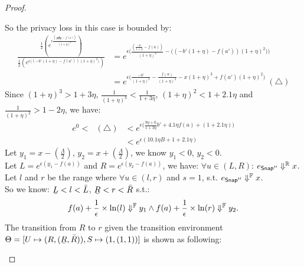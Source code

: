 \documentclass[a4paper,11pt]{article}
\begin{document}
\begin{proof}
\begin{itemize}
		So the privacy loss in this case is bounded by:
		\[
		\begin{array}{ll}
		\frac
		{\frac{1}{2}(e^{\epsilon 
		\frac{(\frac{-b'}{1 + \eta} - f(a))}{(1 + \eta)^2}})}
		{\frac{1}{2}(e^{\epsilon 
		\big((-b'(1 + \eta) - f(a'))(1 + \eta)^2 \big)})}
		& = e^{\epsilon
		\bigg(
		\frac{(\frac{-b'}{1 + \eta} - f(a))}{(1 + \eta)^2}
		-
		\big((-b'(1 + \eta) - f(a'))(1 + \eta)^2 \big)
		\bigg)}\\
		& = e^{\epsilon
		\bigg(
		\frac{-b'}{(1 + \eta)^3} - \frac{f(a)}{(1 + \eta)^2}
		-
		x(1 + \eta)^3 + f(a')(1 + \eta)^2 
		\bigg)} ~ (\triangle)
		\end{array}
		\]
		Since $ (1 + \eta)^3 > 1 + 3\eta$,  $\frac{1}{(1 + \eta)^3} < \frac{1}{1 + 3\eta} $, $(1 + \eta)^2 < 1 + 2.1\eta$ and $\frac{1}{(1 + \eta)^2} > 1 - 2 \eta$, we have:
		\[
		\begin{array}{ll}
		e^0
		<
		~~~ (\triangle) & < e^{\epsilon \big( 
		\frac{9\eta + 6}{1 + 3\eta} b'
		+ 4.1 \eta f(a)
		+ (1 + 2.1\eta) 
		\big)}\\
		& < e^{\epsilon(10.1 \eta B + 1 + 2.1\eta)}
		\end{array}
		\]
		Let $y_1 = x - (\frac{\Lambda}{2})$, $y_2 = x + (\frac{\Lambda}{2})$, we know $y_1 < 0$, $y_2 < 0$.
		\\
		Let $L = e^{\epsilon(y_1 - f(a))}$ and $R = e^{\epsilon(y_2 - f(a))}$, we have: $\forall u \in (L, R)$:
		$e_{\mathsf{Snap}''} \Downarrow^{\mathbb{R}} x$.
		\\
		Let $l$ and $r$ be the range where $\forall u \in (l, r)$ and $s = 1$, s.t.
		$e_{\mathsf{Snap}''} \Downarrow^{\mathbb{F}} x$.
		\\
		So we know: $\ubar{L} < l < \bar{L}$, $\ubar{R} < r < \bar{R}$ s.t.:
		$$f(a) + \frac{1}{\epsilon} \times \ln(l) \Downarrow^{\mathbb{F}} y_1
		\land
		f(a) + \frac{1}{\epsilon} \times \ln(r) \Downarrow^{\mathbb{F}} y_2.$$
		The transition from $R$ to $r$ given the transition environment 
		$\trsenv = [U \mapsto (R, (\ubar{R}, \bar{R})), S \mapsto (1, (1, 1))]$ is shown as following:
		\begin{mathpar}
		{
			}
\end{mathpar}
\end{itemize}
\end{proof}
\end{document}
